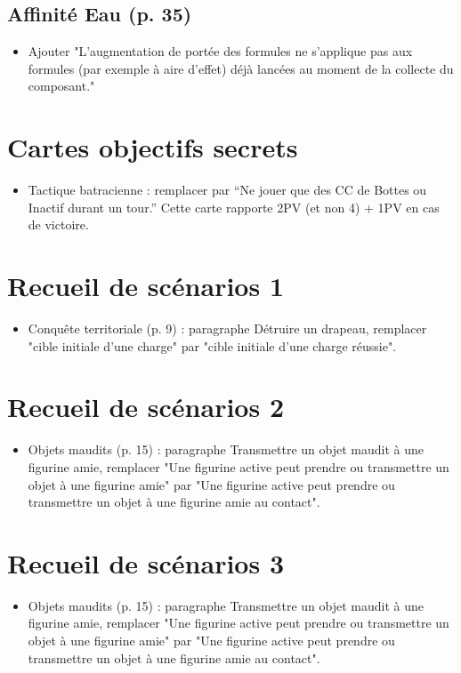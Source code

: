 \documentclass[a4paper,12pt]{article}
\begin{document}
\begin{multicols}{2}
		\subsection*{Affinité Eau (p. 35)}
		\begin{itemize}
			\item Ajouter "L’augmentation de portée des formules ne s’applique pas aux formules (par exemple à aire d’effet) déjà lancées au moment de la collecte du composant."
		\end{itemize}
		
		\section*{Cartes objectifs secrets}
		\begin{itemize}
			\item Tactique batracienne : remplacer par “Ne jouer que des CC de Bottes ou Inactif durant un tour.” Cette carte rapporte 2PV (et non 4) + 1PV en cas de victoire.
		\end{itemize}
		
		\section*{Recueil de scénarios 1}
		\begin{itemize}
			\item Conquête territoriale (p. 9) : paragraphe Détruire un drapeau, remplacer "cible initiale d’une charge" par "cible initiale d’une charge réussie".
		\end{itemize}
		
		\section*{Recueil de scénarios 2}
		\begin{itemize}
			\item Objets maudits (p. 15) : paragraphe Transmettre un objet maudit à une figurine amie, remplacer "Une figurine active peut prendre ou transmettre un objet à une figurine amie" par "Une figurine active peut prendre ou transmettre un objet à une figurine amie au contact".
		\end{itemize}
		
		\section*{Recueil de scénarios 3}
		\begin{itemize}
			\item Objets maudits (p. 15) : paragraphe Transmettre un objet maudit à une figurine amie, remplacer "Une figurine active peut prendre ou transmettre un objet à une figurine amie" par "Une figurine active peut prendre ou transmettre un objet à une figurine amie au contact".
		\end{itemize}
		

\end{multicols}
\end{document}
